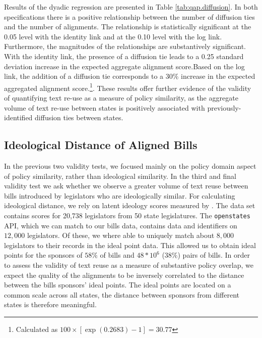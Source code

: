 \documentclass[12pt]{article} %
\begin{document}
Results of the dyadic regression are presented in Table \ref{tab:qap.diffusion}. In both specifications there is a positive relationship between the number of diffusion ties and the number of alignments. The relationship is statistically significant at the 0.05 level with the identity link and at the 0.10 level with the log link. Furthermore, the magnitudes of the relationships are substantively significant. With the identity link, the presence of a diffusion tie leads to a 0.25 standard deviation increase in the expected aggregate alignment score.Based on the log link, the addition of a diffusion tie corresponds to a 30\% increase in the expected aggregated alignment score.\footnote{Calculated as $100\times \left[ \exp(0.2683)-1\right] = 30.77$}. These results offer further evidence of the validity of quantifying text re-use as a measure of policy similarity, as the aggregate volume of text re-use between states is positively associated with previously-identified diffusion ties between states.


\subsection{Ideological Distance of Aligned Bills}

In the previous two validity tests, we focused mainly on the policy domain
aspect of policy similarity, rather than ideological similarity. In the third
and final validity test we ask whether we observe a greater volume of text reuse
between bills introduced by legislators who are ideologically similar. For
calculating ideological distance, we rely on latent ideology scores measured by
\citep{shor2011}. The data set contains scores for 20,738 legislators from 50
state legislatures. The \texttt{openstates} API, which we can match to our bills
data, contains data and identifiers on $12,000$ legislators. Of these, we where
able to uniquely match about $8,000$ legislators to their records in the ideal
point data. This allowed us to obtain ideal points for the sponsors of $58\%$ of
bills and $48*10^6$ ($38\%$) pairs of bills. In order to assess the validity of text reuse as a measure of substantive policy overlap, we expect the quality of the alignments to be inversely correlated to the distance between the bills sponsors' ideal points. The ideal points are located on a common scale across all states, the distance between sponsors from different states is therefore meaningful. 
\end{document}
